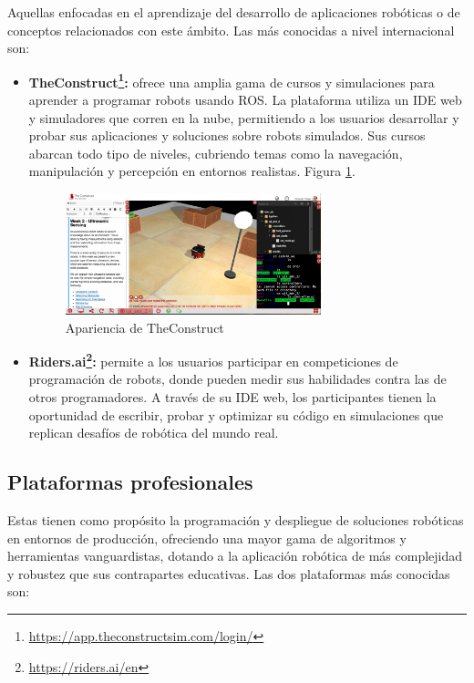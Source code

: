Aquellas enfocadas en el aprendizaje del desarrollo de aplicaciones robóticas o de conceptos relacionados con este ámbito. Las más conocidas a nivel internacional son: 

\begin{itemize}
    \item \textbf{TheConstruct\footnote{\url{https://app.theconstructsim.com/login/}}:} ofrece una amplia gama de cursos y simulaciones para aprender a programar robots usando ROS. La plataforma utiliza un IDE web y simuladores que corren en la nube, permitiendo a los usuarios desarrollar y probar sus aplicaciones y soluciones sobre robots simulados. Sus cursos abarcan todo tipo de niveles, cubriendo temas como la navegación, manipulación y percepción en entornos realistas. Figura \ref{fig:theconstruct}.

    \begin{figure}[H]
        \centering
        \includegraphics[width=0.7\textwidth]{figures/intro/theconstruct.png}
        \caption{Apariencia de TheConstruct}
        \label{fig:theconstruct}
    \end{figure}

    \item \textbf{Riders.ai\footnote{\url{https://riders.ai/en}}:} permite a los usuarios participar en competiciones de programación de robots, donde pueden medir sus habilidades contra las de otros programadores. A través de su IDE web, los participantes tienen la oportunidad de escribir, probar y optimizar su código en simulaciones que replican desafíos de robótica del mundo real. 
\end{itemize}

\subsection{Plataformas profesionales}

Estas tienen como propósito la programación y despliegue de soluciones robóticas en entornos de producción, ofreciendo una mayor gama de algoritmos y herramientas vanguardistas, dotando a la aplicación robótica de más complejidad y robustez que sus contrapartes educativas. Las dos plataformas más conocidas son:

